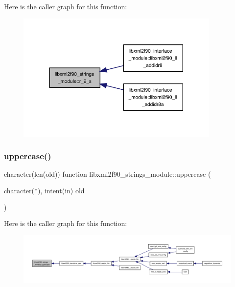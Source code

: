 Here is the caller graph for this function\+:
\nopagebreak
\begin{figure}[H]
\begin{center}
\leavevmode
\includegraphics[width=284pt]{namespacelibxml2f90__strings__module_a3e162b5f18f39c8769659ce67d2357a4_icgraph}
\end{center}
\end{figure}
\mbox{\label{namespacelibxml2f90__strings__module_a9793dff5114e7403d7f95c0b8f493e1d}} 
\subsubsection{\texorpdfstring{uppercase()}{uppercase()}}
{\footnotesize\ttfamily character(len(old)) function libxml2f90\+\_\+strings\+\_\+module\+::uppercase (\begin{DoxyParamCaption}\item[{character($\ast$), intent(in)}]{old }\end{DoxyParamCaption})}

Here is the caller graph for this function\+:
\nopagebreak
\begin{figure}[H]
\begin{center}
\leavevmode
\includegraphics[width=350pt]{namespacelibxml2f90__strings__module_a9793dff5114e7403d7f95c0b8f493e1d_icgraph}
\end{center}
\end{figure}
